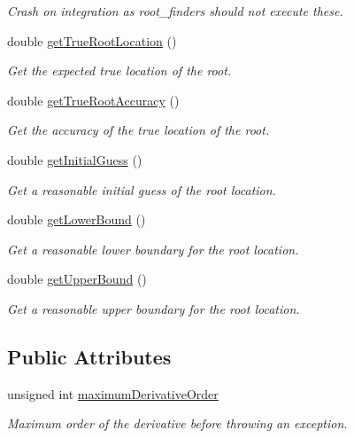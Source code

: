 \begin{DoxyCompactItemize}
\begin{DoxyCompactList}\small\item\em Crash on integration as root\+\_\+finders should not execute these. \end{DoxyCompactList}\item 
double \hyperlink{structtudat_1_1unit__tests_1_1TestFunction1_aa970bc5920328b858d55c37f2602305f}{get\+True\+Root\+Location} ()
\begin{DoxyCompactList}\small\item\em Get the expected true location of the root. \end{DoxyCompactList}\item 
double \hyperlink{structtudat_1_1unit__tests_1_1TestFunction1_ac483f79c432535f3d9ea274e01625b86}{get\+True\+Root\+Accuracy} ()
\begin{DoxyCompactList}\small\item\em Get the accuracy of the true location of the root. \end{DoxyCompactList}\item 
double \hyperlink{structtudat_1_1unit__tests_1_1TestFunction1_acadeb1aed8913ea8e8ad371438879358}{get\+Initial\+Guess} ()
\begin{DoxyCompactList}\small\item\em Get a reasonable initial guess of the root location. \end{DoxyCompactList}\item 
double \hyperlink{structtudat_1_1unit__tests_1_1TestFunction1_aea2427919dbf9f70f31ab6522cc32fe4}{get\+Lower\+Bound} ()
\begin{DoxyCompactList}\small\item\em Get a reasonable lower boundary for the root location. \end{DoxyCompactList}\item 
double \hyperlink{structtudat_1_1unit__tests_1_1TestFunction1_a76a4bee2f4e11b422dea0d86734a7312}{get\+Upper\+Bound} ()
\begin{DoxyCompactList}\small\item\em Get a reasonable upper boundary for the root location. \end{DoxyCompactList}\end{DoxyCompactItemize}
\subsection*{Public Attributes}
\begin{DoxyCompactItemize}
\item 
unsigned int \hyperlink{structtudat_1_1unit__tests_1_1TestFunction1_afc07e4796f1efc593ffbf1b028c26238}{maximum\+Derivative\+Order}\hypertarget{structtudat_1_1unit__tests_1_1TestFunction1_afc07e4796f1efc593ffbf1b028c26238}{}\label{structtudat_1_1unit__tests_1_1TestFunction1_afc07e4796f1efc593ffbf1b028c26238}

\begin{DoxyCompactList}\small\item\em Maximum order of the derivative before throwing an exception. \end{DoxyCompactList}\end{DoxyCompactItemize}
